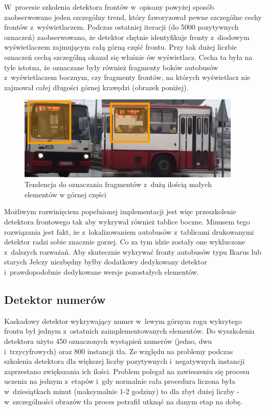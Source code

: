 W~procesie szkolenia detektora frontów w~opisany powyżej sposób
zaobserwowano jeden szczególny trend, który faworyzował pewne
szczególne cechy frontów z~wyświetlaczem. Podczas ostatniej iteracji
(do 5000 pozytywnych oznaczeń) zaobserwowano, że detektor
chętnie identyfikuje fronty z~diodowym wyświetlaczem zajmującym 
całą górną część frontu. Przy tak dużej liczbie oznaczeń
cechą szczególną okazał się właśnie ów wyświetlacz. Cecha ta była
na tyle istotna, że oznaczane były również fragmenty boków autobusów
z~wyświetlaczem bocznym, czy fragmenty frontów, na których wyświetlacz
nie zajmował całej długości górnej krawędzi (obrazek poniżej).

\begin{figure}[!h]
    \centering
    \includegraphics[width=0.95\textwidth]{img/exp_front_detector_curiosity}
    \caption{Tendencja do oznaczania fragmentów z~dużą ilością
    małych elementów w górnej części}
    \label{fig:frontdetectormorph}
\end{figure}

Możliwym rozwinięciem popełnionej implementacji jest więc przeszkolenie
detektora frontowego tak aby wykrywał również tablice boczne. Minusem
tego rozwiązania jest fakt, że z~lokalizowaniem autobusów z~tablicami
drukowanymi detektor radzi sobie znacznie gorzej. Co za tym idzie
zostały one wykluczone z~dalszych rozważań. Aby skutecznie wykrywać
fronty autobusów typu Ikarus lub starych Jelczy niezbędny byłby 
dodatkowy dedykowany detektor i~prawdopodobnie dedykowane wersje
pozostałych elementów.

\subsection{Detektor numerów}

Kaskadowy detektor wykrywający numer w~lewym górnym rogu wykrytego
frontu był jednym z~ostatnich zaimplementowanych elementów. Do wyszkolenia
detektora użyto 450 oznaczonych wystąpień numerów (jedno, dwu
i~trzycyfrowych) oraz 800 instancji tła. Ze względu na problemy podczas
szkolenia detektora dla większej liczby pozytywnych i~negatywnych 
instancji zaprzestano zwiększania ich ilości. Problem polegał na
zawieszeniu się procesu uczenia na jednym z~etapów i~gdy normalnie 
cała procedura liczona była w~dziesiątkach minut (maksymalnie 1-2 godziny)
to dla zbyt dużej liczby - w~szczególności obrazów tła proces potrafił
utknąć na danym etap na dobę.

